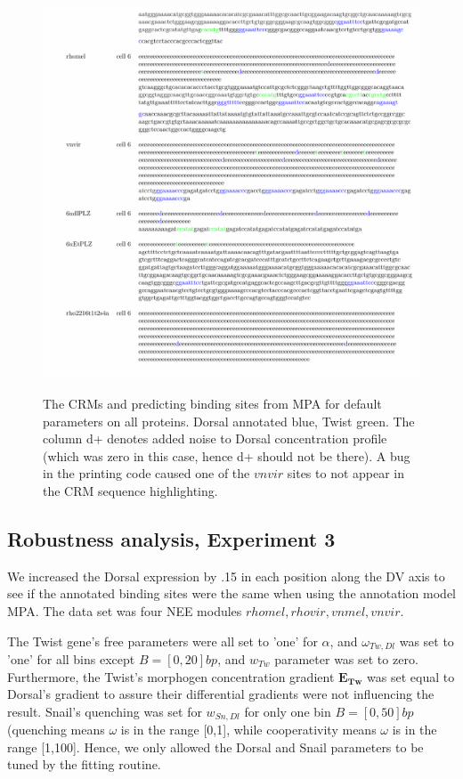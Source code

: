 \begin{figure}
  \includegraphics[width=1\textwidth]{annNosnail.pdf}\\
  \caption{The CRMs and predicting binding sites from MPA for default parameters on all proteins.  Dorsal annotated blue, Twist green. The column d+ denotes added noise to Dorsal concentration profile (which was zero in this case, hence d+ should not be there).  A bug in the printing code caused one of the $vnvir$ sites to not appear in the CRM sequence highlighting. }\label{roughfit}
\end{figure}




\subsection{ Robustness analysis, Experiment 3 }
We increased the Dorsal expression by .15 in each position along the DV axis to see if the annotated binding sites were the same when using the annotation model MPA.  The data set was four NEE modules $rhomel, rhovir, vnmel, vnvir$.


The Twist gene's free parameters were all set to 'one' for $\alpha$, and $\omega_{Tw,Dl}$ was set to 'one' for all bins except $B=[0,20]bp$, and $w_{Tw}$ parameter was set to zero.  Furthermore, the Twist's morphogen concentration gradient $\bm{E_{Tw}}$ was set equal to Dorsal's gradient to assure their differential gradients were not influencing the result.  Snail's quenching was set for $w_{Sn,Dl}$ for only one bin $B=[0,50]bp$ (quenching means $\omega$ is in the range [0,1], while cooperativity means $\omega$ is in the range [1,100].  Hence, we only allowed the Dorsal and Snail parameters to be tuned by the fitting routine.
 
